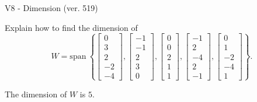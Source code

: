 \begin{exercise}
  \begin{exerciseTitle}V8 - Dimension (ver. 519)\end{exerciseTitle}
  \begin{exerciseStatement}
    Explain how to find the dimension of 
\[W=\mathrm{span}\ \left\{\left[\begin{array}{r}
0 \\
3 \\
2 \\
-2 \\
-4
\end{array}\right] , \left[\begin{array}{r}
-1 \\
-1 \\
2 \\
3 \\
0
\end{array}\right] , \left[\begin{array}{r}
0 \\
0 \\
2 \\
1 \\
1
\end{array}\right] , \left[\begin{array}{r}
-1 \\
2 \\
-4 \\
2 \\
-1
\end{array}\right] , \left[\begin{array}{r}
0 \\
1 \\
-2 \\
-4 \\
1
\end{array}\right]\right\}.\]



  \end{exerciseStatement}
  \begin{exerciseAnswer}
   The dimension of \(W\) is  \(5\).
  


  \end{exerciseAnswer}
\end{exercise}